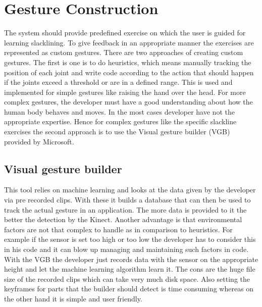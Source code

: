 \section{Gesture Construction}\label{5_2_gestureConstruction}
The system should provide predefined exercise on which the user is guided for learning slacklining. To give feedback in an appropriate manner the exercises are represented as custom gestures. There are two approaches of creating custom gestures. The first is one is to do heuristics, which means manually tracking the position of each joint and write code according to the action that should happen if the joints exceed a threshold or are in a defined range. This is used and implemented for simple gestures like raising the hand over the head. For more complex gestures, the developer must have a good understanding about how the human body behaves and moves. In the most cases developer have not the appropriate expertise. Hence for complex gestures like the specific slackline exercises the second approach is to use the Visual gesture builder (VGB) provided by Microsoft.

\subsection{Visual gesture builder}
This tool relies on machine learning and looks at the data given by the developer via pre recorded clips. With these it builds a database that can then be used to track the actual gesture in an application. The more data is provided to it the better the detection by the Kinect. Another advantage is that environmental factors are not that complex to handle as in comparison to heuristics. For example if the sensor is set too high or too low the developer has to consider this in his code and it can blow up managing and maintaining such factors in code. With the VGB the developer just records data with the sensor on the appropriate height and let the machine learning algorithm learn it. The cons are the huge file size of the recorded clips which can take very much disk space. Also setting the keyframes for parts that the builder should detect is time consuming whereas on the other hand it is simple and user friendly.

